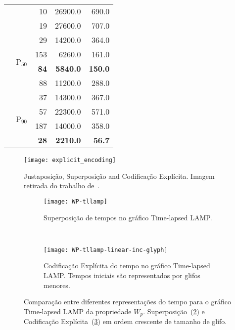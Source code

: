 \begin{table}[H]
\begin{tabular}{llrrr}
                            &                           & 10                & 26900.0          & 690.0          \\
                            &                           & 19                & 27600.0          & 707.0          \\ \cline{2-5} 
                            & \multirow{4}{*}{P$_{50}$} & 29                & 14200.0          & 364.0          \\
                            &                           & 153               & 6260.0          & 161.0          \\
                            &                           & \textbf{84}       & \textbf{5840.0} & \textbf{150.0} \\
                            &                           & 88                & 11200.0          & 288.0          \\ \cline{2-5} 
                            & \multirow{4}{*}{P$_{90}$} & 37                & 14300.0          & 367.0          \\
                            &                           & 57                & 22300.0          & 571.0          \\
                            &                           & 187               & 14000.0          & 358.0          \\
                            &                           & \textbf{28}       & \textbf{2210.0} & \textbf{56.7}  \\ \hline
  \end{tabular}
  \label{tab:cmg-results}
\end{table}

\begin{figure}[H]
  \centering
  \texttt{[image: explicit\_encoding]}
  \caption{Justaposição, Superposição and Codificação Explícita. Imagem retirada do trabalho de~\cite{Szafir2018}.}
  \label{fig:explicit-endoding-szafir}
\end{figure}

\begin{figure}[H]
  \centering
  \begin{subfigure}[t]{0.75\textwidth}
    \centering
    \texttt{[image: WP-tllamp]}
    \caption{Superposição de tempos no gráfico Time-lapsed LAMP.}
    \label{fig:superposition-tllamp-inc}
  \end{subfigure}
  ~
  \begin{subfigure}[t]{0.75\textwidth}
    \centering
    \texttt{[image: WP-tllamp-linear-inc-glyph]}
    \caption{Codificação Explícita do tempo no gráfico Time-lapsed LAMP. Tempos iniciais são representados por glifos menores.}
    \label{fig:ee-tllamp-inc}
  \end{subfigure}
  \caption{Comparação entre diferentes representações do tempo para o gráfico Time-lapsed LAMP da propriedade $W_p$. Superposição~(\ref{fig:superposition-tllamp-inc}) e Codificação Explícita~(\ref{fig:ee-tllamp-inc}) em ordem crescente de tamanho de glifo.}
  \label{fig:explicit-encoding-tllamp-inc}
\end{figure}

